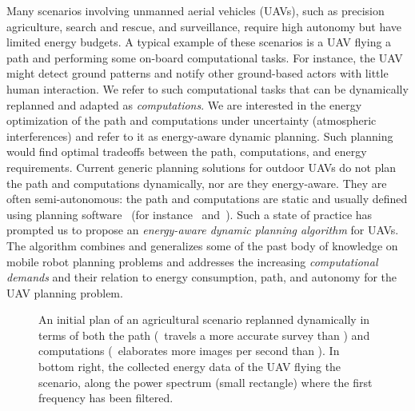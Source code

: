 \documentclass[letterpaper,10pt,conference]{ieeeconf}
\newcommand{\figpath}{./figures}
\theoremstyle{definition}
\begin{document}
Many scenarios involving unmanned aerial vehicles (UAVs), such as precision agriculture, search and rescue, and surveillance, require high autonomy but have limited energy budgets. A typical example of these scenarios is a UAV flying a path and performing some on-board computational tasks. For instance, the UAV might detect ground patterns and notify other ground-based actors with little human interaction. We refer to such computational tasks that can be dynamically replanned and adapted as \emph{computations}. We are interested in the energy optimization of the path and computations under uncertainty (atmospheric interferences) and refer to it as energy-aware dynamic planning. Such planning would find optimal tradeoffs between the path, computations, and energy requirements. Current generic planning solutions for outdoor UAVs do not plan the path and computations dynamically, nor are they energy-aware. They are often semi-autonomous: the path and computations are static and usually defined using planning software~\cite{daponte2019review} (for instance~\cite{papa} and~\cite{px4}). Such a state of practice has prompted us to propose an \emph{energy-aware dynamic planning algorithm} for UAVs. The algorithm combines and generalizes some of the past body of knowledge on mobile robot planning problems and addresses the increasing \emph{computational demands} and their relation to energy consumption, path, and autonomy for the UAV planning problem.

\begin{figure}[t]
  \centering
  
  
  \caption{An initial plan of an agricultural scenario replanned dynamically in terms of both the path (\protect{}\, travels a more accurate survey than \protect{}) and computations (\protect{}\, elaborates more images per second than \protect{}). In bottom right, the collected energy data of the UAV flying the scenario, along the power spectrum (small rectangle) where the first frequency has been filtered.}
  \label{fig:il-abs}
\end{figure}
\end{document}
